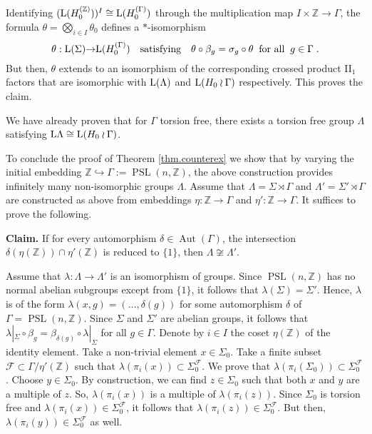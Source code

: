 \documentclass[a4paper,11pt]{amsart}
\numberwithin{equation}{section}
\begin{document}
Identifying $({\mathord{\text{\rm L}}}(H_0^{({\mathbb{Z}})}))^I \cong {\mathord{\text{\rm L}}}(H_0^{(\Gamma)})$ through the multiplication map $I \times {\mathbb{Z}} {\rightarrow} \Gamma$, the formula $\theta = \bigotimes_{i \in I} \theta_0$ defines a $*$-isomorphism
$$\theta : {\mathord{\text{\rm L}}}(\Sigma) {\rightarrow} {\mathord{\text{\rm L}}}(H_0^{(\Gamma)}) \quad\text{satisfying}\quad \theta \circ \beta_g = {\sigma}_g \circ \theta \;\;\text{for all}\;\; g \in \Gamma \; .$$
But then, $\theta$ extends to an isomorphism of the corresponding crossed product II$_1$ factors that are isomorphic with ${\mathord{\text{\rm L}}}(\Lambda)$ and ${\mathord{\text{\rm L}}}(H_0 \wr \Gamma)$ respectively. This proves the claim.

We have already proven that for $\Gamma$ torsion free, there exists a torsion free group $\Lambda$ satisfying ${\mathord{\text{\rm L}}} \Lambda \cong {\mathord{\text{\rm L}}}(H_0 \wr \Gamma)$.

To conclude the proof of Theorem \ref{thm.counterex} we show that by varying the initial embedding ${\mathbb{Z}} \hookrightarrow \Gamma := {\operatorname{PSL}}(n,{\mathbb{Z}})$, the above construction provides infinitely many non-isomorphic groups $\Lambda$. Assume that $\Lambda = \Sigma \rtimes \Gamma$ and $\Lambda' = \Sigma' \rtimes \Gamma$ are constructed as above from embeddings $\eta : {\mathbb{Z}} {\rightarrow} \Gamma$ and $\eta' : {\mathbb{Z}} {\rightarrow} \Gamma$. It suffices to prove the following.

{\bf Claim.} If for every automorphism $\delta \in {\operatorname{Aut}}(\Gamma)$, the intersection $\delta(\eta({\mathbb{Z}})) \cap \eta'({\mathbb{Z}})$ is reduced to $\{1\}$, then $\Lambda \not\cong \Lambda'$.

Assume that $\lambda : \Lambda {\rightarrow} \Lambda'$ is an isomorphism of groups. Since ${\operatorname{PSL}}(n,{\mathbb{Z}})$ has no normal abelian subgroups except from $\{1\}$, it follows that $\lambda(\Sigma) = \Sigma'$. Hence, $\lambda$ is of the form $\lambda(x,g) = (\ldots,\delta(g))$ for some automorphism $\delta$ of $\Gamma = {\operatorname{PSL}}(n,{\mathbb{Z}})$. Since $\Sigma$ and $\Sigma'$ are abelian groups, it follows that $\lambda|_{\Sigma} \circ \beta_g = \beta_{\delta(g)} \circ \lambda|_{\Sigma}$ for all $g \in \Gamma$. Denote by $i \in I$ the coset $\eta({\mathbb{Z}})$ of the identity element. Take a non-trivial element $x \in \Sigma_0$. Take a finite subset ${\mathcal{F}} \subset \Gamma/\eta'({\mathbb{Z}})$ such that $\lambda(\pi_i(x)) \subset \Sigma_0^{\mathcal{F}}$. We prove that $\lambda(\pi_i(\Sigma_0)) \subset \Sigma_0^{\mathcal{F}}$. Choose $y \in \Sigma_0$. By construction, we can find $z \in \Sigma_0$ such that both $x$ and $y$ are a multiple of $z$. So, $\lambda(\pi_i(x))$ is a multiple of $\lambda(\pi_i(z))$. Since $\Sigma_0$ is torsion free and $\lambda(\pi_i(x)) \in \Sigma_0^{\mathcal{F}}$, it follows that $\lambda(\pi_i(z)) \in \Sigma_0^{\mathcal{F}}$. But then, $\lambda(\pi_i(y)) \in \Sigma_0^{\mathcal{F}}$ as well.
\end{document}
